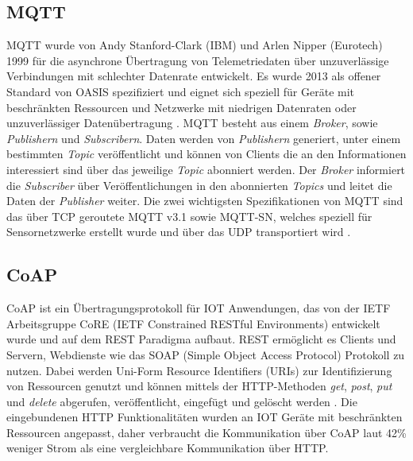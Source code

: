 \documentclass[BMR,Bachelor,ngerman]{twbook}%
\begin{document}
\subsection{\acf{MQTT}}
\ac{MQTT} wurde von Andy Stanford-Clark (IBM) und Arlen Nipper (Eurotech) 1999 für die asynchrone Übertragung von Telemetriedaten über unzuverlässige Verbindungen mit schlechter Datenrate entwickelt. Es wurde 2013 als offener Standard von OASIS spezifiziert \cite{mqtt2018specs} und eignet sich speziell für Geräte mit beschränkten Ressourcen und Netzwerke mit niedrigen Datenraten oder unzuverlässiger Datenübertragung \cite{alfuqaha2015survey}. \ac{MQTT} besteht aus einem \emph{Broker}, sowie \emph{Publishern} und \emph{Subscribern}. Daten werden von \emph{Publishern} generiert, unter einem bestimmten \emph{Topic} veröffentlicht und können von Clients die an den Informationen interessiert sind über das jeweilige \emph{Topic} abonniert werden. Der \emph{Broker} informiert die \emph{Subscriber} über Veröffentlichungen in den abonnierten \emph{Topics} und leitet die Daten der \emph{Publisher} weiter. Die zwei wichtigsten Spezifikationen von \ac{MQTT} sind das über \ac{TCP} geroutete MQTT v3.1 sowie MQTT-SN, welches speziell für Sensornetzwerke erstellt wurde und über das \ac{UDP} transportiert wird \cite{alfuqaha2015survey}.
%
\subsection{\acf{CoAP}}
\ac{CoAP} ist ein Übertragungsprotokoll für \ac{IOT} Anwendungen, das von der \ac{IETF} Arbeitsgruppe CoRE (IETF Constrained RESTful Environments) entwickelt wurde und auf dem \ac{REST} Paradigma aufbaut. \ac{REST} ermöglicht es Clients und Servern, Webdienste wie das SOAP (Simple Object Access Protocol) Protokoll zu nutzen. Dabei werden Uni-Form Resource Identifiers (URIs) zur Identifizierung von Ressourcen genutzt und können mittels der \ac{HTTP}-Methoden \emph{get}, \emph{post}, \emph{put} und \emph{delete} abgerufen, veröffentlicht, eingefügt und gelöscht werden \cite{alfuqaha2015survey}. Die eingebundenen \ac{HTTP} Funktionalitäten wurden an \ac{IOT} Geräte mit beschränkten Ressourcen angepasst, daher verbraucht die Kommunikation über \ac{CoAP} laut  42\% weniger Strom als eine vergleichbare Kommunikation über \ac{HTTP}.
%
\end{document}
